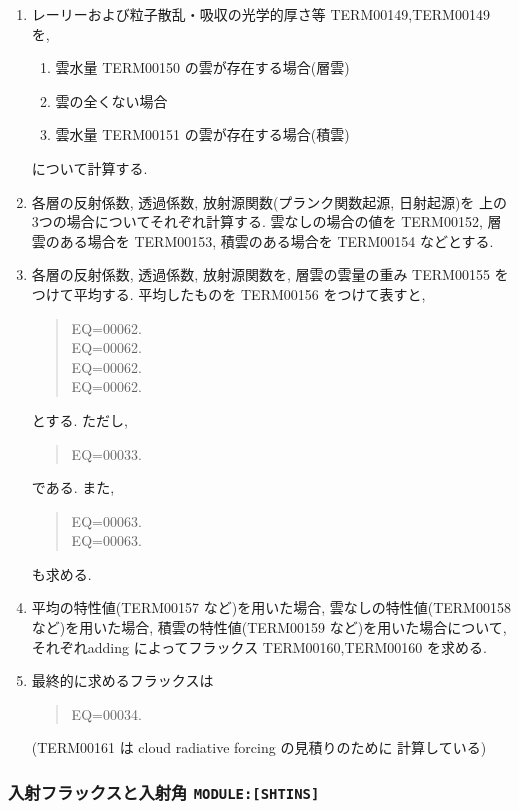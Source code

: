 \begin{enumerate}
\item レーリーおよび粒子散乱・吸収の光学的厚さ等
      TERM00149,TERM00149 を,
      \begin{enumerate}
      \item 雲水量 TERM00150 の雲が存在する場合(層雲)
      \item 雲の全くない場合
      \item 雲水量 TERM00151 の雲が存在する場合(積雲)
      \end{enumerate}
      について計算する.

\item 各層の反射係数, 透過係数, 
      放射源関数(プランク関数起源, 日射起源)を
      上の3つの場合についてそれぞれ計算する.
      雲なしの場合の値を
      TERM00152, 層雲のある場合を TERM00153, 積雲のある場合を
      TERM00154 などとする.

\item 各層の反射係数, 透過係数, 
      放射源関数を, 層雲の雲量の重み TERM00155 をつけて平均する.
      平均したものを TERM00156 をつけて表すと,
      \begin{quote}
EQ=00062.\\
EQ=00062.\\
EQ=00062.\\
EQ=00062.
\end{quote}
      とする. ただし,
      \begin{quote}
EQ=00033.
\end{quote}
      である. 
      また,
      \begin{quote}
EQ=00063.\\
EQ=00063.
\end{quote}
      も求める.

\item 平均の特性値(TERM00157 など)を用いた場合,
      雲なしの特性値(TERM00158 など)を用いた場合,
      積雲の特性値(TERM00159 など)を用いた場合について,
      それぞれadding によってフラックス
      TERM00160,TERM00160 を求める.
      
\item 最終的に求めるフラックスは
      \begin{quote}
EQ=00034.
\end{quote}
      (TERM00161 は cloud radiative forcing の見積りのために
       計算している)

\end{enumerate}

\subsubsection{入射フラックスと入射角 \texttt{MODULE:[SHTINS]}}

